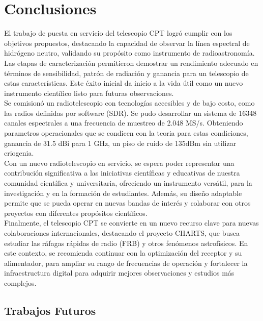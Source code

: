 \chapter{Conclusiones}

El trabajo de puesta en servicio del telescopio CPT logró cumplir con los objetivos propuestos, destacando la capacidad de observar la línea espectral de hidrógeno neutro, validando su propósito como instrumento de radioastronomía. Las etapas de caracterización permitieron demostrar un rendimiento adecuado en términos de sensibilidad, patrón de radiación y ganancia para un telescopio de estas características. Este éxito inicial da inicio a la vida útil como un nuevo instrumento científico listo para futuras observaciones.\\

Se comisionó un radiotelescopio con tecnologías accesibles y de bajo costo, como las radios definidas por software (SDR). Se pudo desarrollar un sistema de 16348 canales espectrales a una frecuencia de muestreo de 2.048 MS/s. Obteniendo parametros operacionales que se condicen con la teoria para estas condiciones, ganancia de 31.5 dBi para 1 GHz, un piso de ruido de 135dBm sin utilizar criogenia.\\

Con un nuevo radiotelescopio en servicio, se espera poder representar una contribución significativa a las iniciativas científicas y educativas de nuestra comunidad científica y universitaria, ofreciendo un instrumento versátil, para la investigación y en la formación de estudiantes. Además, su diseño adaptable permite que se pueda operar en nuevas bandas de interés y colaborar con otros proyectos con diferentes propósitos científicos.\\

Finalmente, el telescopio CPT se convierte en un nuevo recurso clave para nuevas colaboraciones internacionales, destacando el proyecto CHARTS, que busca estudiar las ráfagas rápidas de radio (FRB) y otros fenómenos astrofísicos. En este contexto, se recomienda continuar con la optimización del receptor y su alimentador, para ampliar su rango de frecuencias de operación y fortalecer la infraestructura digital para adquirir mejores observaciones y estudios más complejos.\\

\section{Trabajos Futuros}

